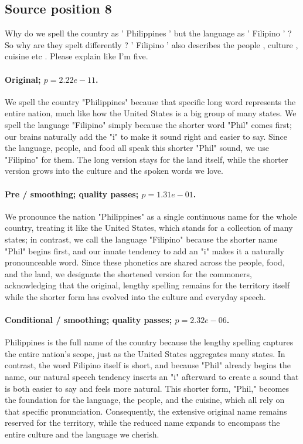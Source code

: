 \subsection*{Source position 8}
Why do we spell the country as ' Philippines ' but the language as ' Filipino ' ? So why are they spelt differently ? ' Filipino ' also describes the people , culture , cuisine etc . Please explain like I'm five.

\paragraph{Original; $p=2.22e-11$.} We spell the country "Philippines" because that specific long word represents the entire nation, much like how the United States is a big group of many states. We spell the language "Filipino" simply because the shorter word "Phil" comes first; our brains naturally add the "i" to make it sound right and easier to say. Since the language, people, and food all speak this shorter "Phil" sound, we use "Filipino" for them. The long version stays for the land itself, while the shorter version grows into the culture and the spoken words we love.


\paragraph{Pre / smoothing; quality passes; $p=1.31e-01$.} We pronounce the nation "Philippines" as a single continuous name for the whole country, treating it like the United States, which stands for a collection of many states; in contrast, we call the language "Filipino" because the shorter name "Phil" begins first, and our innate tendency to add an "i" makes it a naturally pronounceable word. Since these phonetics are shared across the people, food, and the land, we designate the shortened version for the commoners, acknowledging that the original, lengthy spelling remains for the territory itself while the shorter form has evolved into the culture and everyday speech.

\paragraph{Conditional / smoothing; quality passes; $p=2.32e-06$.} Philippines is the full name of the country because the lengthy spelling captures the entire nation's scope, just as the United States aggregates many states. In contrast, the word Filipino itself is short, and because "Phil" already begins the name, our natural speech tendency inserts an "i" afterward to create a sound that is both easier to say and feels more natural. This shorter form, "Phil," becomes the foundation for the language, the people, and the cuisine, which all rely on that specific pronunciation. Consequently, the extensive original name remains reserved for the territory, while the reduced name expands to encompass the entire culture and the language we cherish.

